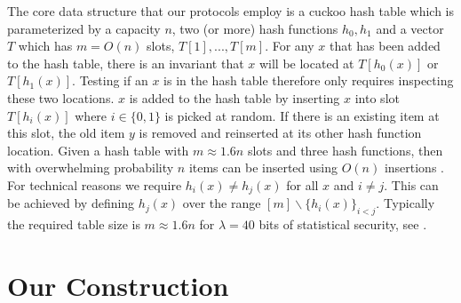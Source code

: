 \documentclass[11pt,letterpaper]{article}
\begin{document}
The core data structure that our protocols employ is a cuckoo hash table which is parameterized by a capacity $n$, two (or more) hash functions $h_0, h_1$ and a vector $T$ which has $m=O(n)$ slots, $T[1], ..., T[m]$. For any $x$ that has been added to the hash table, there is an invariant that $x$ will be located at $T[{h_0(x)}]$ or $T[{h_1(x)}]$. Testing if an $x$ is in the hash table therefore only requires inspecting these two locations. $x$ is added to the hash table by inserting $x$ into slot $T[h_i(x)]$ where $i\in \{0,1\}$ is picked at random. If there is an existing item at this slot, the old item $y$ is removed and reinserted at its other hash function location. 
\iffullversion
Given a hash table with $m\approx1.6n$ slots and three hash functions, then with overwhelming probability $n$ items can be inserted using $O(n)$ insertions \cite{DRRT18}. For technical reasons we require $h_i(x)\neq h_j(x)$ for all $x$ and $i\neq j$. This can be achieved by defining $h_j(x)$ over the range $[m]\backslash \{h_{i}(x)\}_{i < j}$.
\else 
Typically the required table size is $m\approx1.6n$ for $\lambda=40$ bits of statistical security, see \cite{DRRT18}.
\fi \section{Our Construction}\label{sec:construction}
\end{document}
